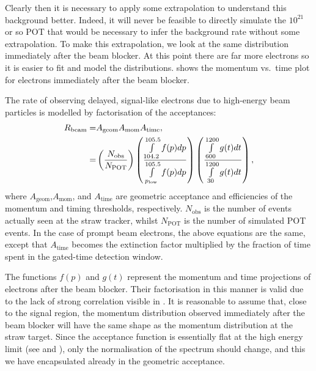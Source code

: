 Clearly then it is necessary to apply some extrapolation to understand this background better.
Indeed, it will never be feasible to directly simulate the $10^{21}$ or so POT that would be necessary to infer the background rate without some extrapolation.
To make this extrapolation, we look at the same distribution immediately after the beam blocker.  
At this point there are far more electrons so it is easier to fit and model the distributions.
 shows the momentum vs.\ time plot for electrons immediately after the beam blocker.

The rate of observing delayed, signal-like electrons due to high-energy beam particles is modelled by factorisation of the acceptances:
\begin{align}
R_\mathrm{beam}=&A_\textrm{geom}A_\textrm{mom}A_\textrm{time},\\
=&\left(\frac{N_\textrm{obs}}{N_\textrm{POT}}\right)\left(\frac{\int\limits_{104.2}^{105.5}f(p)dp}{\int\limits_{p_\textrm{low}}^{105.5}f(p)dp}\right)\left(\frac{\int\limits_{600}^{1200}g(t)dt}{\int\limits_{30}^{1200}g(t)dt}\right),
\eqlabel{bg:beam:factors}
\end{align}
where $A_\textrm{geom}$,$A_\textrm{mom}$, and $A_\textrm{time}$ are geometric acceptance and efficiencies of the momentum and timing thresholds, respectively.
$N_\textrm{obs}$ is the number of events actually seen at the straw tracker, whilst $N_\textrm{POT}$ is the number of simulated \ac{POT} events.
In the case of prompt beam electrons, the above equations are the same, except that $A_\textrm{time}$ becomes the extinction factor multiplied by the fraction of time spent in the gated-time detection window.
\FigBgBeamExtrapolate

The functions $f(p)$ and $g(t)$ represent the momentum and time projections of electrons after the beam blocker. 
Their factorisation in this manner is valid due to the lack of strong correlation visible in .
It is reasonable to assume that, close to the signal region, the momentum distribution observed immediately after the beam blocker will have the same shape as the momentum distribution at the straw target.
Since the acceptance function is essentially flat at the high energy limit (see  and ), only the normalisation of the spectrum should change, and this we have encapsulated already in the geometric acceptance.

